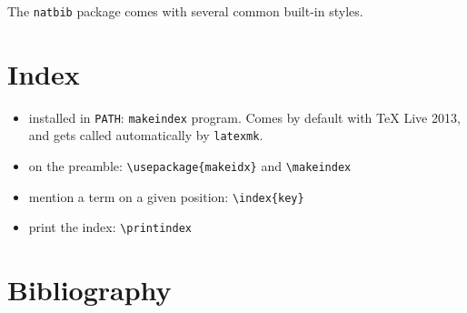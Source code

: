 \documentclass[12pt]{article}
\begin{document}
  The \lstinline|natbib| package comes with several common built-in styles.

\section{Index}\label{index}

  \begin{itemize}
    \item installed in \lstinline|PATH|: \lstinline|makeindex| program. Comes by default with TeX Live 2013, and gets called automatically by \lstinline|latexmk|.
    \item on the preamble: \lstinline|\usepackage{makeidx}| and \lstinline|\makeindex|
    \item mention a term on a given position: \lstinline|\index{key}|
    \item print the index: \lstinline|\printindex|
  \end{itemize}


  \printindex

\section{Bibliography}\label{secBib}

  
  
\end{document}
